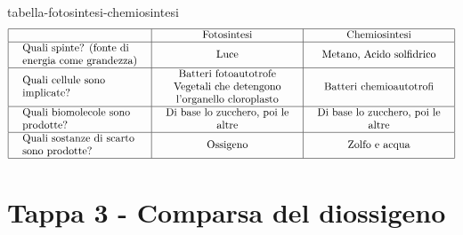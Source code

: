\documentclass[preview]{standalone}
\begin{document}
\begin{snippet}{tabella-fotosintesi-chemiosintesi}
    $$
\begin{array}{|l|c|c|}
\hline & \text { Fotosintesi } & \text { Chemiosintesi } \\
\hline \begin{array}{l}
\text { Quali spinte? (fonte di } \\
\text { energia come grandezza) }
\end{array} & \text { Luce } & \text { Metano, Acido solfidrico } \\
\hline \begin{array}{l}
\text { Quali cellule sono } \\
\text { implicate? }
\end{array} & \begin{array}{c}
\text { Batteri fotoautotrofe } \\
\text { Vegetali che detengono } \\
\text { l'organello cloroplasto }
\end{array} & \text { Batteri chemioautotrofi } \\
\hline \begin{array}{l}
\text { Quali biomolecole sono } \\
\text { prodotte? }
\end{array} & \begin{array}{c}
\text { Di base lo zucchero, poi le } \\
\text { altre }
\end{array} & \begin{array}{c}
\text { Di base lo zucchero, poi le } \\
\text { altre }
\end{array} \\
\hline \begin{array}{l}
\text { Quali sostanze di scarto } \\
\text { sono prodotte? }
\end{array} & \begin{array}{c}
\text { Ossigeno }
\end{array} & \begin{array}{c}
\text { Zolfo e acqua }
\end{array} \\
\hline
\end{array}
$$
\end{snippet}

\section{Tappa 3 - Comparsa del diossigeno}
\end{document}
